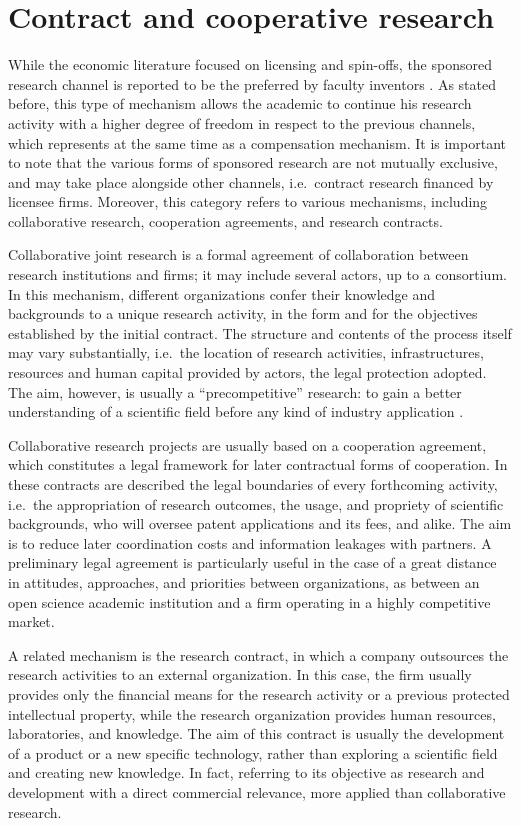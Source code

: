 \section{Contract and cooperative research}

While the economic literature focused on licensing and spin-offs, the sponsored research channel is reported to be the preferred by faculty inventors \citep{Jensen1998}. As stated before, this type of mechanism allows the academic to continue his research activity with a higher degree of freedom in respect to the previous channels, which represents at the same time as a compensation mechanism. It is important to note that the various forms of sponsored research are not mutually exclusive, and may take place alongside other channels, i.e.\ contract research financed by licensee firms. Moreover, this category refers to various mechanisms, including collaborative research, cooperation agreements, and research contracts.

Collaborative joint research is a formal agreement of collaboration between research institutions and firms; it may include several actors, up to a consortium. In this mechanism, different organizations confer their knowledge and backgrounds to a unique research activity, in the form and for the objectives established by the initial contract. The structure and contents of the process itself may vary substantially, i.e.\ the location of research activities, infrastructures, resources and human capital provided by actors, the legal protection adopted. The aim, however, is usually a \enquote{precompetitive} research: to gain a better understanding of a scientific field before any kind of industry application \citep{DEste2011}.

Collaborative research projects are usually based on a cooperation agreement, which constitutes a legal framework for later contractual forms of cooperation. In these contracts are described the legal boundaries of every forthcoming activity, i.e.\ the appropriation of research outcomes, the usage, and propriety of scientific backgrounds, who will oversee patent applications and its fees, and alike. The aim is to reduce later coordination costs and information leakages with partners. A preliminary legal agreement is particularly useful in the case of a great distance in attitudes, approaches, and priorities between organizations, as between an open science academic institution and a firm operating in a highly competitive market. 

A related mechanism is the research contract, in which a company outsources the research activities to an external organization. In this case, the firm usually provides only the financial means for the research activity or a previous protected intellectual property, while the research organization provides human resources, laboratories, and knowledge. The aim of this contract is usually the development of a product or a new specific technology, rather than exploring a scientific field and creating new knowledge. In fact, \citet{DEste2011} referring to its objective as research and development with a direct commercial relevance, more applied than collaborative research.

